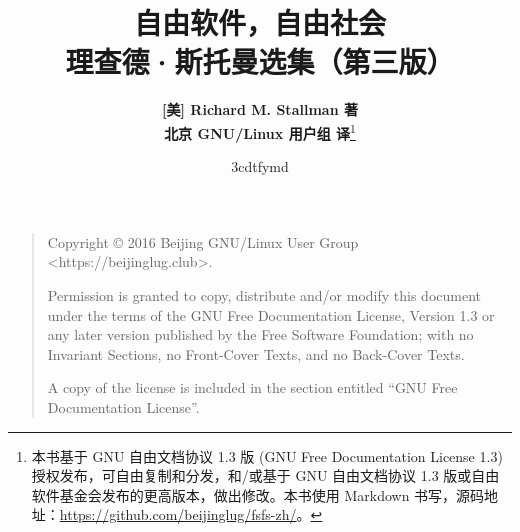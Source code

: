 \documentclass[a5paper, UTF8, openright]{book}
\title{\huge{\textbf{自由软件，自由社会}}\\
\large{理查德·斯托曼选集（第三版）}}
\title{{\savedtitle}}
\author{\textbf{[美] Richard M. Stallman 著}\\
       \textbf{北京 GNU/Linux 用户组 译}\thanks{本书基于 GNU 自由文档协议 1.3 版 (GNU Free Documentation License 1.3) 授权发布，可自由复制和分发，和/或基于 GNU 自由文档协议 1.3 版或自由软件基金会发布的更高版本，做出修改。本书使用 Markdown 书写，源码地址：\url{https://github.com/beijinglug/fsfs-zh/}。}}
\date{\w3cdtfymd}
\renewcommand{\headrulewidth}{0pt}
\newcounter{img}[chapter]
\newcounter{tab}[chapter]
\newcommand{\prechap}{第}
\newcommand{\postchap}{部分}
\renewcommand{\appendixname}{附录 }
\begin{document}
%
\maketitle

\begin{quote}
\noindent
Copyright \copyright{} 2016 Beijing GNU/Linux User Group <https://beijinglug.club>.

\noindent
Permission is granted to copy, distribute and/or modify this document under the terms of the GNU Free Documentation License, Version 1.3 or any later version published by the Free Software Foundation; with no Invariant Sections, no Front-Cover Texts, and no Back-Cover Texts.

\noindent
A copy of the license is included in the section entitled ``GNU Free Documentation License''.
\end{quote}

\thispagestyle{empty}
\setcounter{tocdepth}{1}

\frontmatter

\tableofcontents\newpage\thispagestyle{empty}


\fancyhf{}
\fancyhead[LE]{\color{colorheader}\quad\small\textbf\thepage\quad\quad\small\leftmark}
\fancyhead[RO]{\color{colorheader}\small\rightmark\quad\quad\small\textbf\thepage\quad}
\fancyfoot[LE,RO]{\small\textbf\thepage} %

\renewcommand{\headrulewidth}{0.4pt}  %
\pagestyle{fancy}

\mainmatter

\appendices
\renewcommand{\prechap}{\appendixname}
\renewcommand{\postchap}{}

\end{document}
